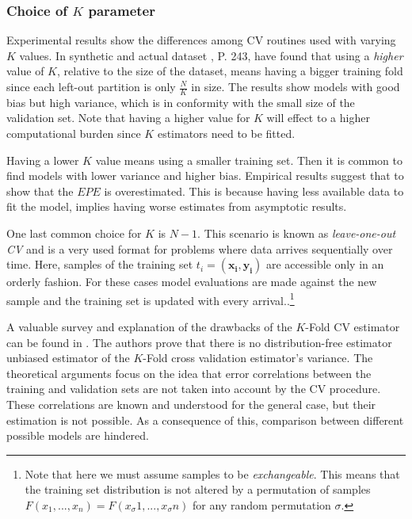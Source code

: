 \subsubsection{Choice of $K$ parameter}

Experimental results show the differences among CV routines used with varying $K$ values. In synthetic and actual dataset , \textcite{hastie-elemstatslearn} P. 243, have found that using a \textit{higher} value of $K$, relative to the size of the dataset, means having a bigger training fold since each left-out partition is only $\frac{N}{K}$ in size. The results show models with good bias but high variance, which is in conformity with the small size of the validation set. Note that having a higher value for $K$ will effect to a higher computational burden since $K$ estimators need to be fitted.

Having a lower $K$ value means using a smaller training set. Then it is common to find models with lower variance and higher bias. Empirical results suggest that to show that the $EPE$ is overestimated. This is because having less available data to fit the model, implies having worse estimates from asymptotic results.

One last common choice for $K$ is $N-1$. This scenario is known as \textit{leave-one-out CV} and is a very used format for problems where data arrives sequentially over time. Here, samples of the training set $t_i = ( \boldsymbol{x_i} , \boldsymbol{y_i} )$ are accessible only in an orderly fashion. For these cases model evaluations are made against the new sample and the training set is updated with every arrival..\footnote{Note that here we must assume samples to be \textit{exchangeable}. This means that the training set  distribution is not altered by a permutation of samples $F(x_1,...,x_n ) = F(x_\sigma{1},...,x_\sigma{n})$ for any random permutation $\sigma$.}


A valuable survey and explanation of the drawbacks of the $K$-Fold CV estimator can be found in \textcite{bengio-unbiasedCvEstimator}. The authors prove that there is no distribution-free estimator unbiased estimator of the $K$-Fold cross validation estimator's variance. The theoretical arguments focus on the idea that error correlations between the training and validation sets are not taken into account by the CV procedure. These correlations are known and understood for the general case, but their estimation is not possible. As a consequence of this, comparison between different possible models are hindered.

